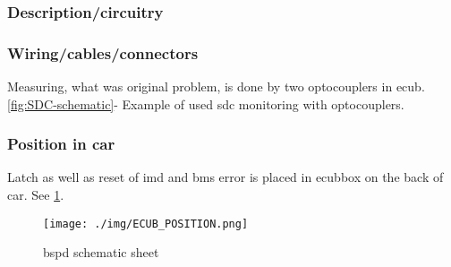 \subsubsection{Description/circuitry}

\subsubsection{Wiring/cables/connectors}
\iffalse Describe wiring, show schematics, describe connectors and cables used and show useful data regarding the wiring.  If not detailed in section 2.1, be sure to show how the device opens the shutdown circuit.\fi
Measuring, what was original problem, is done by two optocouplers in \gls{ecub}. \ref{fig:SDC-schematic}- Example of used \gls{sdc} monitoring with optocouplers.
\subsubsection{Position in car}
Latch as well as reset of \gls{imd} and \gls{bms} error is placed in \gls{ecub}box on the back of car. See \ref{fig:ecub_position}.

\begin{figure}[H]
	\centering
	\texttt{[image: ./img/ECUB\_POSITION.png]}
	\caption{\gls{bspd} schematic sheet}
	\label{fig:ecub_position}
\end{figure}